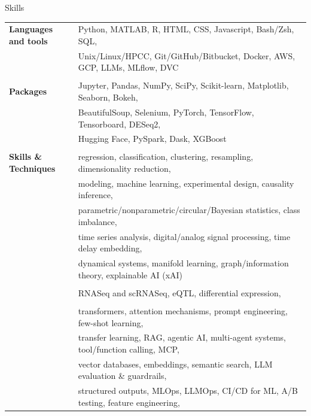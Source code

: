 \documentclass{resume} %
\begin{document}

\begin{rSection}{Skills}
\begin{tabular}{ @{} >{\bfseries}l @{\hspace{2ex}} l }
Languages and tools&
\small{Python, MATLAB, R, HTML, CSS, Javascript, Bash/Zsh, SQL, }\\
& \small{Unix/Linux/HPCC, Git/GitHub/Bitbucket, Docker, AWS, GCP, LLMs, MLflow, DVC}\\
\\[-.5em]
Packages&
\small{Jupyter, Pandas, NumPy, SciPy, Scikit-learn, Matplotlib, Seaborn, Bokeh, }\\
& \small{BeautifulSoup, Selenium, PyTorch, TensorFlow, Tensorboard, DESeq2,}\\
& \small{Hugging Face, PySpark, Dask, XGBoost}\\
\\[-.5em]
Skills \& Techniques&
\small{regression, classification, clustering, resampling, dimensionality reduction,}\\
& \small{modeling, machine learning, experimental design, causality inference,}\\
& \small{parametric/nonparametric/circular/Bayesian statistics, class imbalance,}\\
& \small{time series analysis, digital/analog signal processing, time delay embedding,}\\
& \small{dynamical systems, manifold learning, graph/information theory, explainable AI (xAI)}\\
\\[-.5em]
& \small{RNASeq and scRNASeq, eQTL, differential expression,}\\
\\[-.5em]
& \small{transformers, attention mechanisms, prompt engineering, few-shot learning,}\\
& \small{transfer learning, RAG, agentic AI, multi-agent systems, tool/function calling, MCP,}\\
& \small{vector databases, embeddings, semantic search, LLM evaluation \& guardrails,}\\
& \small{structured outputs, MLOps, LLMOps, CI/CD for ML, A/B testing, feature engineering,}\\

\end{tabular}
\end{rSection}
\end{document}
